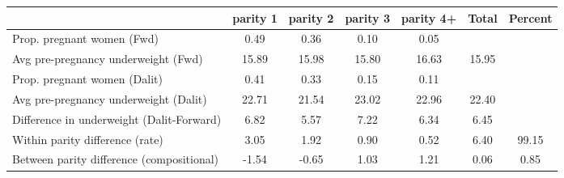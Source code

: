 \begin{tabular}{l*{6}{c}}
\toprule
            &\multicolumn{1}{c}{parity 1}&\multicolumn{1}{c}{parity 2}&\multicolumn{1}{c}{parity 3}&\multicolumn{1}{c}{parity 4+}&\multicolumn{1}{c}{Total}&\multicolumn{1}{c}{Percent}\\
\midrule
\midrule
Prop. pregnant women (Fwd)&        0.49&        0.36&        0.10&        0.05&            &            \\
Avg pre-pregnancy underweight (Fwd)&       15.89&       15.98&       15.80&       16.63&       15.95&            \\
Prop. pregnant women (Dalit)&        0.41&        0.33&        0.15&        0.11&            &            \\
Avg pre-pregnancy underweight (Dalit)&       22.71&       21.54&       23.02&       22.96&       22.40&            \\
Difference in underweight (Dalit-Forward)&        6.82&        5.57&        7.22&        6.34&        6.45&            \\
Within parity difference (rate)&        3.05&        1.92&        0.90&        0.52&        6.40&       99.15\\
Between parity difference (compositional)&       -1.54&       -0.65&        1.03&        1.21&        0.06&        0.85\\
\bottomrule
\end{tabular}
